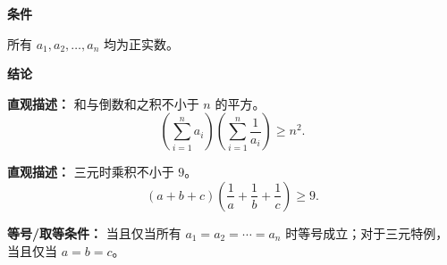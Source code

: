 \begin{statementbox}

\textbf{\textcolor{CStatement}{条件}}
\begin{description}[style=nextline, leftmargin=2.8em, labelsep=0.5em, itemsep=0.35em]
    \item[\textbf{\textcolor{CStatement}{条件 1（正实数）：}}] 所有 $a_1, a_2, \ldots, a_n$ 均为正实数。
\end{description}

\textbf{\textcolor{CStatement}{结论}}
\begin{description}[style=nextline, leftmargin=2.8em, labelsep=0.5em, itemsep=0.45em]
    \item[\textbf{\textcolor{CStatement}{结论一（倒数和积不等式）：}}]
    \textbf{\textcolor{CStatement}{直观描述：}} 和与倒数和之积不小于 $n$ 的平方。
    \[
    \left( \sum_{i=1}^n a_i \right) \left( \sum_{i=1}^n \frac{1}{a_i} \right) \geq n^2.
    \]

    \item[\textbf{\textcolor{CStatement}{推广结论（三元特例）：}}]
    \textbf{\textcolor{CStatement}{直观描述：}} 三元时乘积不小于 $9$。
    \[
    (a+b+c)\left(\frac{1}{a}+\frac{1}{b}+\frac{1}{c}\right) \geq 9.
    \]
\end{description}

\textbf{\textcolor{CStatement}{等号/取等条件：}} 当且仅当所有 $a_1 = a_2 = \cdots = a_n$ 时等号成立；对于三元特例，当且仅当 $a=b=c$。

\end{statementbox}
